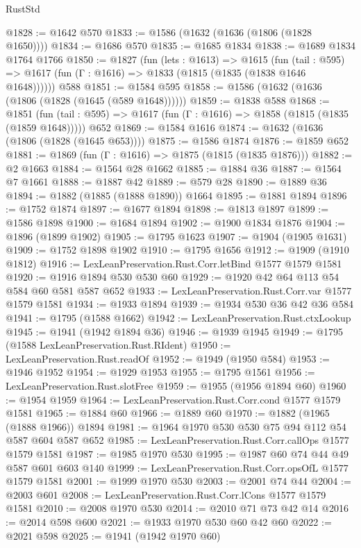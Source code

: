 \begin{lexlean}{RustStd}
\begin{coremodule}
@1828 := @1642 @570
@1833 := @1586 (@1632 (@1636 (@1806 (@1828 @1650))))
@1834 := @1686 @570
@1835 := @1685 @1834
@1838 := @1689 @1834 @1764 @1766
@1850 := @1827
    (fun (lets : @1613) =>
    @1615
      (fun (tail : @595) => @1617 (fun (Γ : @1616) => @1833 (@1815 (@1835 (@1838 @1646 @1648))))))
    @588
@1851 := @1584 @595
@1858 := @1586 (@1632 (@1636 (@1806 (@1828 (@1645 (@589 @1648))))))
@1859 := @1838 @588
@1868 := @1851
    (fun (tail : @595) => @1617 (fun (Γ : @1616) => @1858 (@1815 (@1835 (@1859 @1648)))))
    @652
@1869 := @1584 @1616
@1874 := @1632 (@1636 (@1806 (@1828 (@1645 @653))))
@1875 := @1586 @1874
@1876 := @1859 @652
@1881 := @1869 (fun (Γ : @1616) => @1875 (@1815 (@1835 @1876)))
@1882 := @2 @1663
@1884 := @1564 @28 @1662
@1885 := @1884 @36
@1887 := @1564 @7 @1661
@1888 := @1887 @42
@1889 := @579 @28
@1890 := @1889 @36
@1894 := @1882 (@1885 (@1888 @1890)) @1664
@1895 := @1881 @1894
@1896 := @1752 @1874
@1897 := @1677 @1894
@1898 := @1813 @1897
@1899 := @1586 @1898
@1900 := @1684 @1894
@1902 := @1900 @1834 @1876
@1904 := @1896 (@1899 @1902)
@1905 := @1795 @1623
@1907 := @1904 (@1905 @1631)
@1909 := @1752 @1898 @1902
@1910 := @1795 @1656
@1912 := @1909 (@1910 @1812)
@1916 := LexLeanPreservation.Rust.Corr.letBind @1577 @1579 @1581
@1920 := @1916 @1894 @530 @530 @60
@1929 := @1920 @42 @64 @113 @54 @584 @60 @581 @587 @652
@1933 := LexLeanPreservation.Rust.Corr.var @1577 @1579 @1581
@1934 := @1933 @1894
@1939 := @1934 @530 @36 @42 @36 @584
@1941 := @1795 (@1588 @1662)
@1942 := LexLeanPreservation.Rust.ctxLookup
@1945 := @1941 (@1942 @1894 @36)
@1946 := @1939 @1945
@1949 := @1795 (@1588 LexLeanPreservation.Rust.RIdent)
@1950 := LexLeanPreservation.Rust.readOf
@1952 := @1949 (@1950 @584)
@1953 := @1946 @1952
@1954 := @1929 @1953
@1955 := @1795 @1561
@1956 := LexLeanPreservation.Rust.slotFree
@1959 := @1955 (@1956 @1894 @60)
@1960 := @1954 @1959
@1964 := LexLeanPreservation.Rust.Corr.cond @1577 @1579 @1581
@1965 := @1884 @60
@1966 := @1889 @60
@1970 := @1882 (@1965 (@1888 @1966)) @1894
@1981 := @1964 @1970 @530 @530 @75 @94 @112 @54 @587 @604 @587 @652
@1985 := LexLeanPreservation.Rust.Corr.callOps @1577 @1579 @1581
@1987 := @1985 @1970 @530
@1995 := @1987 @60 @74 @44 @49 @587 @601 @603 @140
@1999 := LexLeanPreservation.Rust.Corr.opsOfL @1577 @1579 @1581
@2001 := @1999 @1970 @530
@2003 := @2001 @74 @44
@2004 := @2003 @601
@2008 := LexLeanPreservation.Rust.Corr.lCons @1577 @1579 @1581
@2010 := @2008 @1970 @530
@2014 := @2010 @71 @73 @42 @14
@2016 := @2014 @598 @600
@2021 := @1933 @1970 @530 @60 @42 @60
@2022 := @2021 @598
@2025 := @1941 (@1942 @1970 @60)

\end{coremodule}
\end{lexlean}
